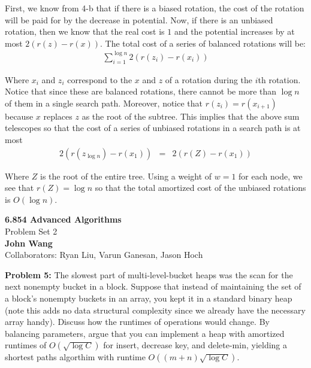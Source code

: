 \documentclass[psamsfonts]{amsart}
\newenvironment{sol}{\vspace{0.25cm}{\large \bfseries Solution:}}{\qedsymbol}
\newenvironment{prob}[1]{\begin{framed}{\large \bfseries Problem #1:}}{\end{framed}}
\newcommand{\makenewtitle}{
\begin{center}
{\huge \bfseries 6.854 Advanced Algorithms} \\
Problem Set 2\\
\vspace{0.25cm}
{\bfseries John Wang} \\
Collaborators: Ryan Liu, Varun Ganesan, Jason Hoch
\end{center}
\vspace{0.5cm}
}
\begin{document}
\begin{sol}
First, we know from 4-b that if there is a biased rotation, the cost of the rotation will be paid for by the decrease in potential. Now, if there is an unbiased rotation, then we know that the real cost is $1$ and the potential increases by at most $2(r(z) - r(x))$. The total cost of a series of balanced rotations will be:
\begin{eqnarray}
\sum_{i=1}^{\log n} 2 ( r(z_i) - r(x_i))
\end{eqnarray}

Where $x_i$ and $z_i$ correspond to the $x$ and $z$ of a rotation during the $i$th rotation. Notice that since these are balanced rotations, there cannot be more than $\log n$ of them in a single search path. Moreover, notice that $r(z_i) = r(x_{i+1})$ because $x$ replaces $z$ as the root of the subtree. This implies that the above sum telescopes so that the cost of a series of unbiased rotations in a search path is at most
\begin{eqnarray}
2(r(z_{\log n}) - r(x_1)) &=& 2(r(Z) - r(x_1))
\end{eqnarray}

Where $Z$ is the root of the entire tree. Using a weight of $w=1$ for each node, we see that $r(Z) = \log n$ so that the total amortized cost of the unbiased rotations is $O(\log n)$.
\end{sol}

\newpage
\makenewtitle

\begin{prob}{5}
The slowest part of multi-level-bucket heaps was the scan for the next nonempty bucket in a block. Suppose that instead of maintaining the set of a block's nonempty buckets in an array, you kept it in a standard binary heap (note this adds no data structural complexity since we already have the necessary array handy). Discuss how the runtimes of operations would change. By balancing parameters, argue that you can implement a heap with amortized runtimes of $O(\sqrt{\log C})$ for insert, decrease key, and delete-min, yielding a shortest paths algorthim with runtime $O((m+n) \sqrt{\log C})$. 
\end{prob}
\end{document}
